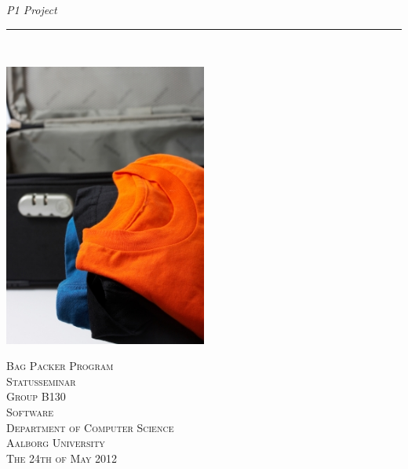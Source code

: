 \thispagestyle{empty}
\begin{flushright}
\vspace{3cm}

\phantom{hul}

\phantom{hul}

\phantom{hul}

\textsl{P1 Project} \\ \vspace{1cm}

\rule{13cm}{3mm} \\ \vspace{1.5cm}
\vspace{1cm}

\includegraphics[width=0.5\textwidth]{billeder/forside.jpg}

\vspace{2cm} 
\textsc{\Large Bag Packer Program \\
Statusseminar\\
Group B130\\
Software\\
Department of Computer Science\\
Aalborg University\\
The 24th of May 2012\\
}
\end{flushright}

